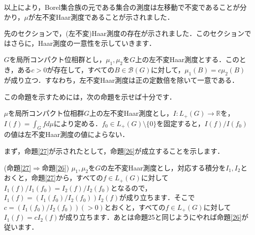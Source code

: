 \begin{Proof}
以上により，Borel集合族の元である集合の測度は左移動で不変であることが分かり，$\mu$が左不変Haar測度であることが示されました．　
\end{Proof}
先のセクションで，(左不変)Haar測度の存在が示されました．このセクションではさらに，Haar測度の一意性を示していきます．

\begin{yprop}\label{26}
$G$を局所コンパクト位相群とし，$\mu_1, \mu_2$を$G$上の左不変Haar測度とする．このとき，ある$c>0$が存在して，すべての$B \in \mathscr{B}(G)$に対して，$\mu_1(B)=c\mu_2(B)$が成り立つ．すなわち，左不変Haar測度は正の定数倍を除いて一意である．
\end{yprop}
この命題を示すためには，次の命題を示せば十分です．
\begin{yprop}\label{27}
$\mu$を局所コンパクト位相群$G$上の左不変Haar測度とし，$I : L_{+}(G) \to \mathbb{R}$を，$I(f)=\int_{G}f d\mu$により定める．$f_0 \in L_{+}(G) \setminus \{ 0 \} $を固定すると，$I(f)/I(f_0)$の値は左不変Haar測度の値によらない．
\end{yprop}
まず，命題\ref{27}が示されたとして，命題\ref{26}が成立することを示します．
\begin{Proof}(命題\ref{27}$\Rightarrow$命題\ref{26}) $\mu_1, \mu_2$を$G$の左不変Haar測度とし，対応する積分を$I_1, I_2$とおくと，命題\ref{27}から，すべての$f \in L_{+}(G)$に対して$I_{1}(f)/I_{1}(f_0)=I_{2}(f)/I_{2}(f_0)$となるので，$I_{1}(f)= \left( I_{1}(f_0)/I_{2}(f_{0}) \right) I_{2}(f)$が成り立ちます．そこで$c=\left( I_{1}(f_0)/I_{2}(f_{0}) \right)(>0)$とおくと，すべての$f \in L_{+}(G)$に対して$I_{1}(f)= c I_{2}(f)$が成り立ちます．あとは命題25と同じようにやれば命題\ref{26}が従います．
\end{Proof}

